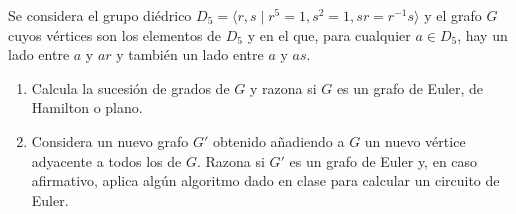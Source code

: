 \begin{ejercicio}\label{ej:1.35}
    Se considera el grupo diédrico $D_5 = \langle r, s \mid r^5 = 1, s^2 = 1, sr = r^{-1}s \rangle$ y el grafo $G$ cuyos vértices son los elementos de $D_5$ y en el que, para cualquier $a \in D_5$, hay un lado entre $a$ y $ar$ y también un lado entre $a$ y $as$.
    \begin{enumerate}
        \item Calcula la sucesión de grados de $G$ y razona si $G$ es un grafo de Euler, de Hamilton o plano.
        \item Considera un nuevo grafo $G'$ obtenido añadiendo a $G$ un nuevo vértice adyacente a todos los de $G$. Razona si $G'$ es un grafo de Euler y, en caso afirmativo, aplica algún algoritmo dado en clase para calcular un circuito de Euler.
    \end{enumerate}
\end{ejercicio}

